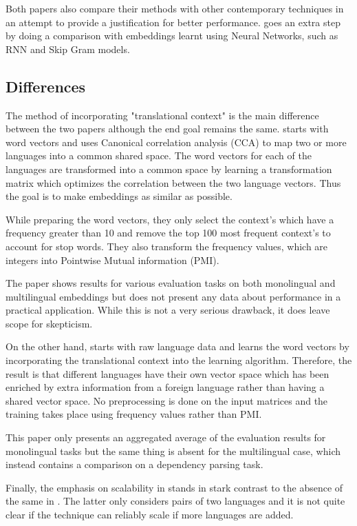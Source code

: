\documentclass[11pt]{article}
\begin{document}
Both papers also compare their methods with other contemporary techniques in an attempt to provide a justification for better performance. \cite{faruqui2014improving} goes an extra step by doing a comparison with embeddings learnt using Neural Networks, such as RNN and Skip Gram models.

\subsection{Differences}
The method of incorporating "translational context" is the main difference between the two papers although the end goal remains the same. \cite{faruqui2014improving} starts with word vectors and uses Canonical correlation analysis (CCA) to map two or more languages into a common shared space. The word vectors for each of the languages are transformed into a common space by learning a transformation matrix which optimizes the correlation between the two language vectors. Thus the goal is to make embeddings as similar as possible.

While preparing the word vectors, they only select the context's which have a frequency greater than 10 and remove the top 100 most frequent context's to account for stop words. They also transform the frequency values, which are integers into Pointwise Mutual information (PMI).

The paper shows results for various evaluation tasks on both monolingual and multilingual embeddings but does not present any data about performance in a practical application. While this is not a very serious drawback, it does leave scope for skepticism.

On the other hand, \cite{huang2015translation} starts with raw language data and learns the word vectors by incorporating the translational context into the learning algorithm. Therefore, the result is that different languages have their own vector space which has been enriched by extra information from a foreign language rather than having a shared vector space. No preprocessing is done on the input matrices and the training takes place using frequency values rather than PMI.

This paper only presents an aggregated average of the evaluation results for monolingual tasks but the same thing is absent for the multilingual case, which instead contains a comparison on a dependency parsing task.

Finally, the emphasis on scalability in \cite{huang2015translation} stands in stark contrast to the absence of the same in \cite{faruqui2014improving}. The latter only considers pairs of two languages and it is not quite clear if the technique can reliably scale if more languages are added.
\end{document}

